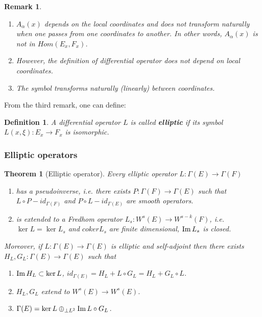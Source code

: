 \documentclass[11pt]{article}
\newtheorem{remark}{Remark}
\newtheorem{theorem}{Theorem}
\newtheorem{definition}{Definition}
\newcommand{\im}{\mathop{\rm Im}\nolimits}
\begin{document}
\begin{remark}
\begin{enumerate}
\item \(A_\alpha (x)\) depends on the local coordinates and does not transform naturally
when one passes from one coordinates to another. In other words, \(A_\alpha(x)\) is
not in \(Hom(E_x, F_x)\).
\item However, the definition of differential operator does not depend on local coordinates.
\item The symbol transforms naturally (linearly) between coordinates.
\end{enumerate}
\end{remark}

From the third remark, one can define:

\begin{definition}
A differential operator \(L\) is called \textbf{elliptic} if its symbol \(L(x, \xi): E_x
\longrightarrow F_x\) is isomorphic.
\end{definition}


\subsubsection{Elliptic operators}
\label{sec:org3a9009e}
\begin{theorem}[Elliptic operator]
\label{thm:elliptic-operator}
Every elliptic operator \(L: \Gamma(E) \longrightarrow \Gamma(F)\) 
\begin{enumerate}
\item has a pseudoinverse, i.e. there exists \(P:\Gamma(F) \longrightarrow \Gamma(E)\) such
that \(L\circ P - id_{\Gamma(F)}\) and \(P\circ L - id_{\Gamma(E)}\) are smooth operators.
\item is extended to a Fredhom operator \(L_s : W^s(E) \longrightarrow W^{s-k}(F)\),
i.e. \(\ker L = \ker L_s\) and \(coker L_s\) are finite dimensional, \(\im L_s\)
is closed.
\end{enumerate}
Moreover, if \(L : \Gamma(E) \longrightarrow \Gamma(E)\) is elliptic and self-adjoint
then there exists \(H_L, G_L: \Gamma(E) \longrightarrow \Gamma(E)\) such that 
\begin{enumerate}
\item \(\im H_L\subset \ker L\), \(id_{\Gamma(E)} = H_L + L\circ G_L = H_L + G_L\circ L\).
\item \(H_L, G_L\) extend to \(W^s(E) \longrightarrow W^s(E)\).
\item \(\Gamma(E) = \ker L \oplus_{\perp L^2} \im L\circ G_L\).
\end{enumerate}
\end{theorem}
\end{document}
